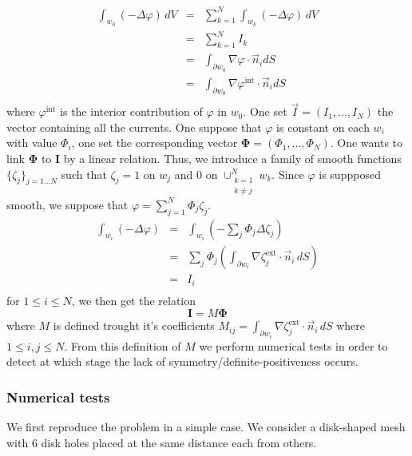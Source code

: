 \begin{equation}
  \label{eq:traceeqnw0}
  \begin{array}{rcl}
    \int_{w_0} (-\Delta \varphi) \, dV &=& \sum_{k=1}^N \int_{w_k} (-\Delta \varphi) \, dV \\
                                      &=& \sum_{k=1}^N I_k \\
                                      &=& \int_{\partial w_0} \nabla \varphi \cdot \vec{n}_i dS \\
                                      &=& \int_{\partial w_0} \nabla \varphi^{\text{int}} \cdot \vec{n}_i dS \\
  \end{array}
\end{equation}
where $\varphi^{\text{int}}$ is the interior contribution of $\varphi$ in
$w_0$. One set $\vec{I}=(I_1,...,I_N)$ the vector containing all the currents.
One suppose that $\varphi$ is constant on each $w_i$ with value $\Phi_i$, one
set the corresponding vector $\mathbf{\Phi}=(\Phi_1,...,\Phi_N)$. One wants to
link $\mathbf{\Phi}$ to $\mathbf{I}$ by a linear relation. Thus, we introduce a
family of smooth functions $\{ \zeta_j \}_{j=1...N}$ such that $\zeta_j = 1 $
on $w_j$ and 0 on $\cup_{\substack{k=1 \\ k\ne j}}^N w_k$. Since $\varphi$ is
suppposed smooth, we suppose that $\varphi = \sum_{j=1}^N \Phi_j \zeta_j$.
\begin{equation}
  \label{eq:derive.cap}
  \begin{array}{rcl}
    \int_{w_i} (-\Delta \varphi)  &=& \int_{w_i} (- \sum_j \Phi_j \Delta \zeta_j) \\
                                  &=& \sum_j \Phi_j \left( \int_{\partial w_i} \nabla \zeta^{\text{ext}}_j \cdot \vec{n}_i \, dS \right) \\
                                  &=& I_i \\
  \end{array}
\end{equation}
for $1\le i \le N$,  we then get the relation 
\[
\mathbf{I} = M \mathbf{\Phi}
\]
where $M$ is defined trought it's coefficients $M_{ij}=\int_{\partial w_i}
\nabla \zeta^{\text{ext}}_j \cdot \vec{n}_i \, dS$ where $1\le i,j \le N$. From
this definition of $M$ we perform numerical tests in order to detect at which
stage the lack of symmetry/definite-positiveness occurs.

\subsubsection*{Numerical tests}
We first reproduce the problem in a simple case. We consider a disk-shaped mesh
with 6 disk holes placed at the same distance each from others. 

